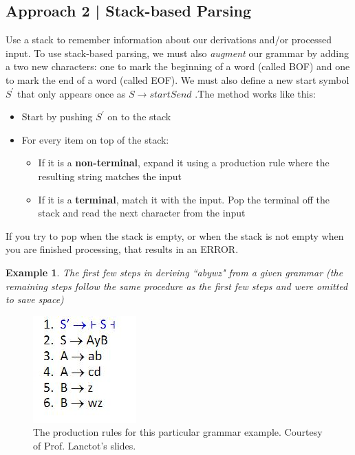 \documentclass{report}
\newtheorem{ex}{Example}[section]
\begin{document}
\subsection{Approach 2 | Stack-based Parsing}
Use a stack to remember information about our derivations and/or processed input. To use stack-based parsing, we must also \textit{augment} our grammar by adding a two new characters: one to mark the beginning of a word (called BOF) and one to mark the end of a word (called EOF). We must also define a new start symbol $S^\prime$ that only appears once as $S \rightarrow start S end$
.The method works like this:
\begin{itemize}
\item Start by pushing $S^\prime$ on to the stack
\item For every item on top of the stack:
\begin{itemize}
\item If it is a \textbf{non-terminal}, expand it using a production rule where the resulting string matches the input
\item If it is a \textbf{terminal}, match it with the input. Pop the terminal off the stack and read the next character from the input
\end{itemize}
\end{itemize}
If you try to pop when the stack is empty, or when the stack is not empty when you are finished processing, that results in an ERROR.
\begin{ex}
The first few steps in deriving ``abywz" from a given grammar (the remaining steps follow the same procedure as the first few steps and were omitted to save space)
\end{ex}
\begin{figure}[ht]
\begin{center}
\includegraphics[scale=0.7]{rules1.jpg}
\end{center}
\caption{The production rules for this particular grammar example. Courtesy of Prof. Lanctot's slides.}
\end{figure}
\end{document}
